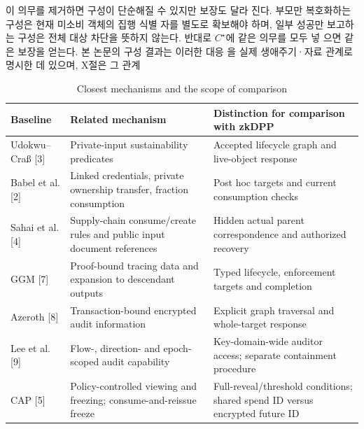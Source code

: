 이 의무를 제거하면 구성이 단순해질 수 있지만 보장도 달라
진다. 부모만 복호화하는 구성은 현재 미소비 객체의 집행 식별
자를 별도로 확보해야 하며, 일부 성공만 보고하는 구성은 전체
대상 차단을 뜻하지 않는다. 반대로 \(C^{\star }\)에 같은 의무를 모두 넣
으면 같은 보장을 얻는다. 본 논문의 구성 결과는 이러한 대응
을 실제 생애주기·자료 관계로 명시한 데 있으며, X절은 그 관계



\begin{table}[htbp]\centering\small
    \setcounter{table}{0}\caption{Closest mechanisms and the scope of comparison}
    \begin{tabularx}{\linewidth}{@{}XXX@{}}\toprule
        \textbf{Baseline}                          & \textbf{Related mechanism}                                             & \textbf{Distinction for comparison with zkDPP}                                        \\ \midrule
        Udokwu--Craß [3]                           & Private-input sustainability predicates                                & Accepted lifecycle graph and live-object response                                     \\
        Babel et al. [2]                           & Linked credentials, private ownership transfer, fraction consumption   & Post hoc targets and current consumption checks                                       \\
        Sahai et al. [4]                           & Supply-chain consume/create rules and public input document references & Hidden actual parent correspondence and authorized recovery                           \\
        GGM [7]                                    & Proof-bound tracing data and expansion to descendant outputs           & Typed lifecycle, enforcement targets and completion                                   \\
        Azeroth [8]                                & Transaction-bound encrypted audit information                          & Explicit graph traversal and whole-target response                                    \\
        Lee et al. [9]                             & Flow-, direction- and epoch-scoped audit capability                    & Key-domain-wide auditor access; separate containment procedure                        \\
        CAP [5]                                    & Policy-controlled viewing and freezing; consume-and-reissue freeze     & Full-reveal/threshold conditions; shared spend ID versus encrypted future ID          \\

\end{tabularx}
\end{table}
